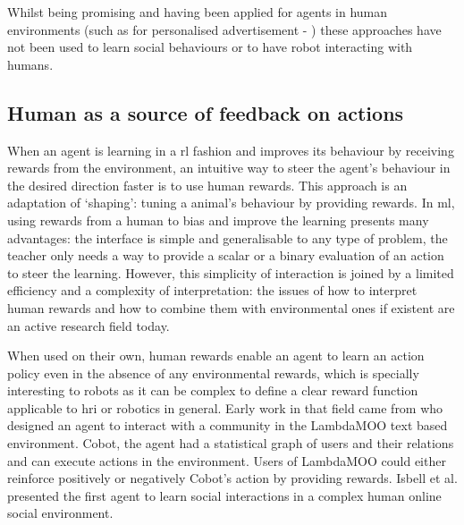 	Whilst being promising and having been applied for agents in human environments (such as for personalised advertisement - \citealt{theocharous2015personalized})	these approaches have not been used to learn social behaviours or to have robot interacting with humans.

\subsection{Human as a source of feedback on actions}

When an agent is learning in a \gls{rl} fashion and improves its behaviour by receiving rewards from the environment, an intuitive way to steer the agent's behaviour in the desired direction faster is to use human rewards. This approach is an adaptation of `shaping': tuning a animal's behaviour by providing rewards. In \gls{ml}, using rewards from a human to bias and improve the learning presents many advantages: the interface is simple and generalisable to any type of problem, the teacher only needs a way to provide a scalar or a binary evaluation of an action to steer the learning. However, this simplicity of interaction is joined by a limited efficiency and a complexity of interpretation: the issues of how to interpret human rewards and how to combine them with environmental ones if existent are an active research field today.

When used on their own, human rewards enable an agent to learn an action policy even in the absence of any environmental rewards, which is specially interesting to robots as it can be complex to define a clear reward function applicable to \gls{hri} or robotics in general. Early work in that field came from \cite{isbell2006cobot} who designed an agent to interact with a community in the LambdaMOO text based environment. Cobot, the agent had a statistical graph of users and their relations and can execute actions in the environment. Users of LambdaMOO could either reinforce positively or negatively Cobot's action by providing rewards. Isbell et al. presented the first agent to learn social interactions in a complex human online social environment. 


